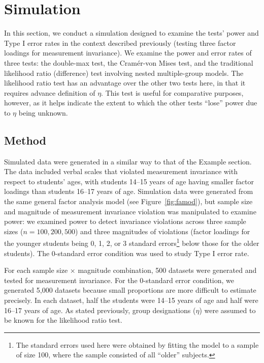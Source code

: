 \documentclass[man]{apa}
\begin{document}
\section{Simulation}
In this section, we conduct a simulation designed to
examine the tests' power and Type I error rates in the context
described previously (testing three factor loadings for measurement
invariance).  We 
examine the power and error rates of three tests: the double-max test, the
Cram\'{e}r-von Mises test, and the traditional likelihood
ratio (difference) test involving nested 
multiple-group models.  The likelihood ratio test has an advantage over the
other two tests here, in that it requires advance definition of
$\eta$.  This test is useful for comparative purposes,
however, as it helps indicate the extent to which the other tests
``lose'' power due to $\eta$ being unknown.

\subsection{Method}
Simulated data were generated in a similar way to that of 
the Example section.
The data included verbal scales that violated measurement invariance
with respect to students' ages, with students 14--15 years of age
having smaller factor loadings than students 16--17 years of age.  
Simulation data were generated from the same general factor analysis
model (see Figure~\ref{fig:famod}), but sample size and magnitude
of measurement 
invariance violation was manipulated to examine power:
we examined power to detect 
invariance violations across three sample sizes ($n=100,
200, 500$) and three magnitudes of violations (factor loadings
for the younger students being 0, 1, 2, or 3 standard
errors\footnote{The standard errors used here were
  obtained by fitting
  the model to a sample of size 100, where the sample consisted of all
  ``older'' subjects.} below 
those for the older students).  The 0-standard error condition was
used to study Type I error rate.

For each sample size $\times$
magnitude combination, 500 datasets were generated and tested for
measurement invariance.  For the 0-standard error condition, we
generated 5,000 datasets because small proportions are more
 difficult to estimate precisely.  In each dataset, half the
students were 14--15 
years of age and half were 16--17 years of age.  As stated previously,
group
designations ($\eta$) were assumed to be
known for the likelihood ratio test.
\end{document}
